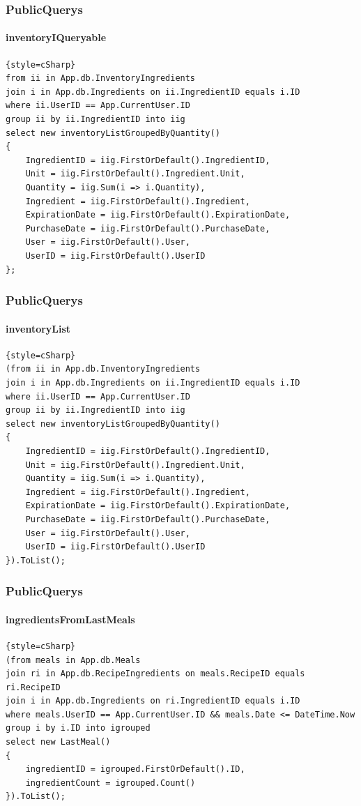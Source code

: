 \begin{frame}[fragile]
\frametitle{PublicQuerys}
\framesubtitle{inventoryIQueryable}
\fontsize{8pt}{7}\selectfont
\begin{lstlisting}{style=cSharp}
from ii in App.db.InventoryIngredients
join i in App.db.Ingredients on ii.IngredientID equals i.ID
where ii.UserID == App.CurrentUser.ID
group ii by ii.IngredientID into iig
select new inventoryListGroupedByQuantity()
{
    IngredientID = iig.FirstOrDefault().IngredientID,
    Unit = iig.FirstOrDefault().Ingredient.Unit,
    Quantity = iig.Sum(i => i.Quantity),
    Ingredient = iig.FirstOrDefault().Ingredient,
    ExpirationDate = iig.FirstOrDefault().ExpirationDate,
    PurchaseDate = iig.FirstOrDefault().PurchaseDate,
    User = iig.FirstOrDefault().User,
    UserID = iig.FirstOrDefault().UserID
};
\end{lstlisting}
\end{frame}

\begin{frame}[fragile]
\frametitle{PublicQuerys}
\framesubtitle{inventoryList}
\fontsize{8pt}{7}\selectfont
\begin{lstlisting}{style=cSharp}
(from ii in App.db.InventoryIngredients
join i in App.db.Ingredients on ii.IngredientID equals i.ID
where ii.UserID == App.CurrentUser.ID
group ii by ii.IngredientID into iig
select new inventoryListGroupedByQuantity()
{
    IngredientID = iig.FirstOrDefault().IngredientID,
    Unit = iig.FirstOrDefault().Ingredient.Unit,
    Quantity = iig.Sum(i => i.Quantity),
    Ingredient = iig.FirstOrDefault().Ingredient,
    ExpirationDate = iig.FirstOrDefault().ExpirationDate,
    PurchaseDate = iig.FirstOrDefault().PurchaseDate,
    User = iig.FirstOrDefault().User,
    UserID = iig.FirstOrDefault().UserID
}).ToList();
\end{lstlisting}
\end{frame}

\begin{frame}[fragile]
\frametitle{PublicQuerys}
\framesubtitle{ingredientsFromLastMeals}
\fontsize{8pt}{7}\selectfont
\begin{lstlisting}{style=cSharp}
(from meals in App.db.Meals
join ri in App.db.RecipeIngredients on meals.RecipeID equals ri.RecipeID
join i in App.db.Ingredients on ri.IngredientID equals i.ID
where meals.UserID == App.CurrentUser.ID && meals.Date <= DateTime.Now
group i by i.ID into igrouped
select new LastMeal()
{
    ingredientID = igrouped.FirstOrDefault().ID,
    ingredientCount = igrouped.Count()
}).ToList();
\end{lstlisting}
\end{frame}

